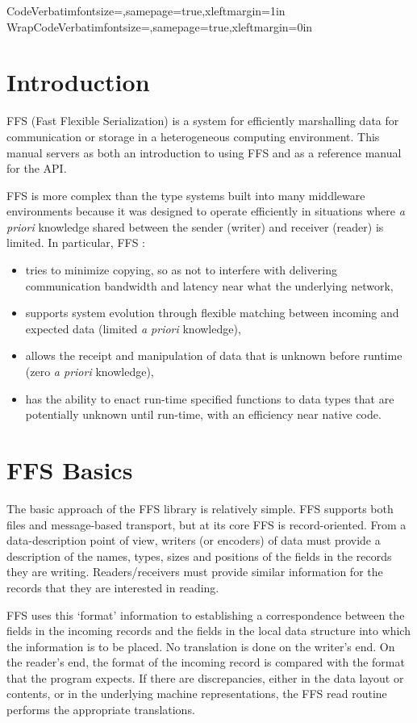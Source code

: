\DefineVerbatimEnvironment%
{Code}{Verbatim}{fontsize=\small,samepage=true,xleftmargin=1in}
\DefineVerbatimEnvironment%
{WrapCode}{Verbatim}{fontsize=\small,samepage=true,xleftmargin=0in}
\section{Introduction}

FFS (Fast Flexible Serialization) is a system for efficiently marshalling
data for communication or storage in a heterogeneous computing environment.
This manual servers as both an introduction to using FFS and as a reference
manual for the API.

FFS is more complex than the type systems built into many middleware
environments because it was designed to operate efficiently in situations
where {\it a priori} knowledge shared between the sender (writer) and
receiver (reader) is limited.  In particular, FFS :
\begin{itemize}
\item tries to minimize copying, so as not to interfere with
  delivering communication bandwidth and latency near what the underlying
  network,
\item supports system evolution through flexible matching between incoming
  and expected data (limited {\it a priori} knowledge),
\item allows the receipt and manipulation of data that is unknown before
  runtime (zero {\it a priori} knowledge),
\item has the ability to enact run-time specified functions to data types that
  are potentially unknown until run-time, with an efficiency near native code.
\end{itemize}

\section{FFS Basics}

The basic approach of the FFS library is relatively simple.  FFS supports
both files and message-based transport, but at its core FFS is
record-oriented.  From a data-description point of view, writers (or
encoders) of data must provide a description of the names, types, sizes and
positions of the fields in the records they are writing.  Readers/receivers must
provide similar information for the records that they are interested in
reading.

FFS uses this `format' information to establishing a correspondence between
the fields in the incoming records and the fields in the local data
structure into which the information is to be placed.  No translation is
done on the writer's end.  On the reader's end, the format of the incoming
record is compared with the format that the program expects.  If there are
discrepancies, either in the data layout or contents, or in the underlying
machine representations, the FFS read routine performs the appropriate
translations.


